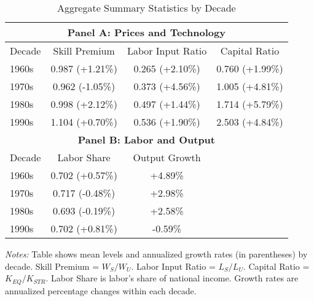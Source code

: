 \begin{table}[H]
\centering
\caption{Aggregate Summary Statistics by Decade}
\label{tab:aggregate_summary_stats}
\small
\begin{tabular}{lccc}
\toprule
\multicolumn{4}{c}{\textbf{Panel A: Prices and Technology}} \\
\midrule
Decade & Skill Premium & Labor Input Ratio & Capital Ratio \\
\midrule
1960s & 0.987 (+1.21\%) & 0.265 (+2.10\%) & 0.760 (+1.99\%) \\
1970s & 0.962 (-1.05\%) & 0.373 (+4.56\%) & 1.005 (+4.81\%) \\
1980s & 0.998 (+2.12\%) & 0.497 (+1.44\%) & 1.714 (+5.79\%) \\
1990s & 1.104 (+0.70\%) & 0.536 (+1.90\%) & 2.503 (+4.84\%) \\
\midrule
\multicolumn{4}{c}{\textbf{Panel B: Labor and Output}} \\
\midrule
Decade & Labor Share & Output Growth & \\
\midrule
1960s & 0.702 (+0.57\%) & +4.89\% & \\
1970s & 0.717 (-0.48\%) & +2.98\% & \\
1980s & 0.693 (-0.19\%) & +2.58\% & \\
1990s & 0.702 (+0.81\%) & -0.59\% & \\
\bottomrule
\end{tabular}
\begin{minipage}{\textwidth}
\vspace{0.2cm}
\footnotesize
\textit{Notes:} Table shows mean levels and annualized growth rates (in parentheses) by decade.
Skill Premium = $W_S/W_U$. Labor Input Ratio = $L_S/L_U$. Capital Ratio = $K_{EQ}/K_{STR}$.
Labor Share is labor's share of national income. Growth rates are annualized percentage changes within each decade.
\end{minipage}
\end{table}